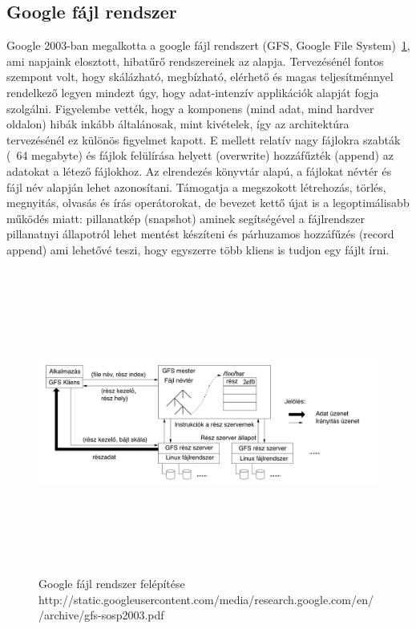 \documentclass[a4paper,12pt]{article}
\begin{document}
\subsection{Google fájl rendszer}
Google 2003-ban megalkotta a google fájl rendszert (GFS, Google File System)~\ref{gfs}, ami napjaink elosztott, hibatűrő rendszereinek az alapja. Tervezésénél fontos szempont volt, hogy skálázható, megbízható, elérhető és magas teljesítménnyel rendelkező legyen mindezt úgy, hogy adat-intenzív applikációk alapját fogja szolgálni. Figyelembe vették, hogy a komponens (mind adat, mind hardver oldalon) hibák inkább általánosak, mint kivételek, így az architektúra tervezésénél ez különös figyelmet kapott. E mellett relatív nagy fájlokra szabták (~64 megabyte) és fájlok felülírása helyett (overwrite) 
hozzáfűzték (append) az adatokat a létező fájlokhoz. Az elrendezés könyvtár alapú, a fájlokat névtér és fájl név alapján lehet azonosítani. Támogatja a megszokott létrehozás, törlés, megnyitás, olvasás és írás operátorokat, de bevezet kettő újat is a legoptimálisabb működés miatt: pillanatkép (snapshot) aminek segítségével a fájlrendszer pillanatnyi állapotról lehet mentést készíteni és párhuzamos hozzáfűzés (record append) ami lehetővé teszi, hogy egyszerre több kliens is tudjon egy fájlt írni. 

\begin{figure}[ht!]
\centering
\includegraphics[width=130mm, height=100mm, keepaspectratio]{img/gfs.png}
\caption{Google fájl rendszer felépítése
http://static.googleusercontent.com/media/research.google.com/en//archive/gfs-sosp2003.pdf \label{gfs}}
\end{figure}
\end{document}
